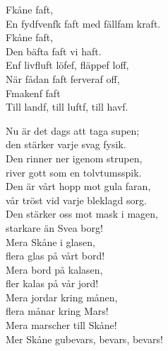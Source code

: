 \documentclass[a6paper, 10pt, twoside]{article}
\begin{document}
\noindent
\begin{center}
\end{center}
\begin{lyrics}
Fkåne faft, \\
En fydfvenfk faft med fällfam kraft. \\
Fkåne faft, \\
Den bäfta faft vi haft. 
\vspace{5pt}\\
Enf livfluft löfef, fläppef loff, \\
När fådan faft ferveraf off, \\
Fmakenf faft \\
Till landf, till luftf, till havf. 
\end{lyrics}
\begin{center}
\end{center}
\begin{lyrics}
Nu är det dags att taga supen; \\
den stärker varje svag fysik. \\
Den rinner ner igenom strupen, \\
river gott som en tolvtumsspik. 
\vspace{5pt}\\
Den är vårt hopp mot gula faran, \\
vår tröst vid varje bleklagd sorg. \\
Den stärker oss mot mask i magen, \\
starkare än Svea borg! 
\vspace{5pt}\\
Mera Skåne i glasen, \\
flera glas på vårt bord! \\
Mera bord på kalasen, \\
fler kalas på vår jord! \\
Mera jordar kring månen, \\
flera månar kring Mars! \\
Mera marscher till Skåne! \\
Mer Skåne gubevars, bevars, bevars! 
\end{lyrics}
\end{document}
